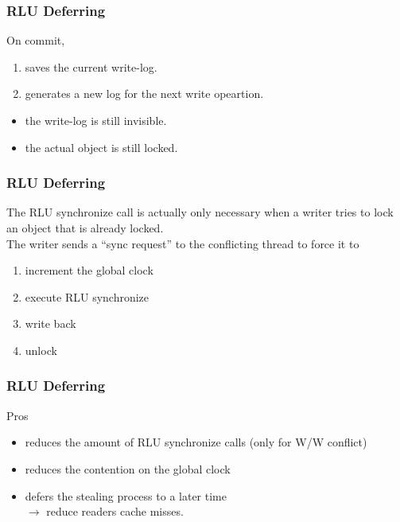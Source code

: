 \documentclass{beamer}
\begin{document}
\begin{frame}[t]
  \frametitle{RLU Deferring}

  On commit,
  \begin{enumerate}
  \item saves the current write-log.
  \item generates a new log for the next write opeartion.
  \end{enumerate}

  \begin{itemize}
  \item the write-log is still invisible.
  \item the actual object is still locked.
  \end{itemize}
  
\end{frame}


\begin{frame}[t]
  \frametitle{RLU Deferring}

  The RLU synchronize call is actually only necessary when
  a writer tries to lock an object that is already locked.\\

  The writer sends a ``sync request'' to the conflicting thread to force it to
  \begin{enumerate}
  \item increment the global clock
  \item execute RLU synchronize
  \item write back
  \item unlock
  \end{enumerate}
  
\end{frame}


\begin{frame}[t]
  \frametitle{RLU Deferring}

  Pros
  \begin{itemize}
  \item reduces the amount of RLU synchronize calls (only for W/W conflict)
  \item reduces the contention on the global clock
  \item defers the stealing process to a later time\\
    $\rightarrow$ reduce readers cache misses.
  \end{itemize}
  
\end{frame}
\end{document}
